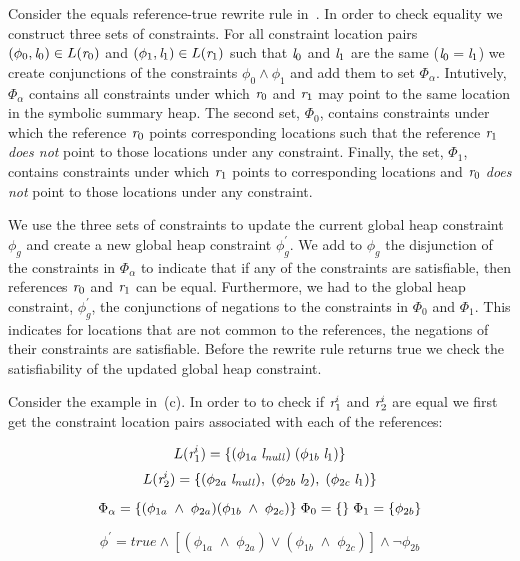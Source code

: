 Consider the equals reference-true rewrite rule
in~. In order to check equality we construct three
sets of constraints. For all constraint location pairs $(\phi_0, \emph{l}_0)
\in L(\emph{r}_0)$ and $(\phi_1, \emph{l}_1) \in L(\emph{r}_1)$ such that $\emph{l}_0$ and $\emph{l}_1$
are the same ($\emph{l}_0 = \emph{l}_1$) we create conjunctions of the constraints
$\phi_0 \wedge \phi_1$ and add them to set $\Phi_\alpha$. Intutively,
$\Phi_\alpha$ contains all constraints under which $\emph{r}_0$ and $\emph{r}_1$ may
point to the same location in the symbolic summary heap. The second
set, $\Phi_0$, contains constraints under which the reference $\emph{r}_0$
points corresponding locations such that the reference $\emph{r}_1$
\emph{does not} point to those locations under any
constraint. Finally, the set, $\Phi_1$, contains constraints under
which $\emph{r}_1$ points to corresponding locations and $\emph{r}_0$ \emph{does
  not} point to those locations under any constraint.

We use the three sets of constraints to update the current global heap
constraint $\phi_g$ and create a new global heap constraint
$\phi_g^\prime$. We add to $\phi_g$ the disjunction of the constraints
in $\Phi_\alpha$ to indicate that if any of the constraints are
satisfiable, then references $\emph{r}_0$ and $\emph{r}_1$ can be
equal. Furthermore, we had to the global heap constraint,
$\phi_g^\prime$, the conjunctions of negations to the constraints in
$\Phi_0$ and $\Phi_1$. This indicates for locations that are not
common to the references, the negations of their constraints are
satisfiable. Before the rewrite rule returns true we check the
satisfiability of the updated global heap constraint.

Consider the example in~(c). In order to to check
if $\emph{r}_1^i$ and $\emph{r}_2^i$ are equal we first get the constraint location
pairs associated with each of the references:

\[
L(\emph{r}_1^i) = \{ (\phi_{1a}\; \emph{l}_\mathit{null})\; (\phi_{1b}\; \emph{l}_1) \} 
\]
\[
L(\emph{r}_2^i) = \{ (\phi_{2a}\; \emph{l}_\mathit{null}),\; (\phi_{2b}\; \emph{l}_2),\; (\phi_{2c}\; \emph{l}_1) \} \\
\]


\[
\Phi_\alpha = \{ (\phi_{1a}\; \wedge\; \phi_{2a} ) (\phi_{1b}\; \wedge\; \phi_{2c} ) \}\;
\Phi_0 = \{ \}\; \Phi_1 = \{ \phi_{2b}\} \\
\]

\[
\phi^\prime = \mathit{true} \wedge [ (\phi_{1a}\; \wedge\; \phi_{2a} )\vee (\phi_{1b}\; \wedge\; \phi_{2c} ) ] \wedge \neg\phi_{2b} 
\]

